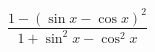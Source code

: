 \begin{ex}[type=expression]
	\begin{condition}
		\( \dfrac{1-(\sin x-\cos x)^2}{1+\sin^2 x-\cos ^2x} \)
	\end{condition}
\end{ex}